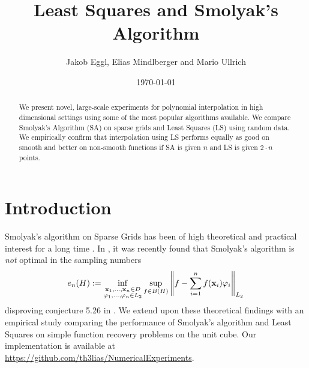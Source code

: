 \documentclass[12pt, oneside]{amsart}
\theoremstyle{definition}
\theoremstyle{remark}
\numberwithin{equation}{section}
\begin{document}
\title{Least Squares and Smolyak's Algorithm}

\author{Jakob Eggl, Elias Mindlberger and Mario Ullrich}
\date{\today}

%
%



\begin{abstract}
	We present novel, large-scale experiments for polynomial interpolation in 
	high dimensional settings using some of the most popular algorithms 
	available. 
	We compare Smolyak's Algorithm (SA) on sparse grids and Least Squares (LS) 
	using random data. We empirically confirm that interpolation using LS 
	performs equally as good on smooth and better on non-smooth functions if SA 
	is given \(n\) and LS is given \(2 \cdot n\) points.
\end{abstract}

\maketitle


\section{Introduction}

Smolyak's algorithm on Sparse Grids has been of high theoretical and practical 
interest for a long time 
\cite{BarthelmannHighDim_2000,smolyak1963,Coleman_SmoylakGithub_2013,JuddSmolyak_2014}.
 In \cite{Krieg_2020}, it was recently found that Smolyak's algorithm is 
\emph{not} optimal in the sampling numbers
\[
e_n(H) \defn \inf_{\substack{\bfx_1, \dots, \bfx_n \in D \\ \phi_1, \dots, \phi_n 
		\in L_2}} \sup_{f \in B(H)} \norm[L_2]{f - \sum_{i=1}^n f(\bfx_i) 
		\phi_i}
\]
disproving conjecture 5.26 in \cite{Dung_Temlyakov_Ullrich_2018}. We extend 
upon these theoretical findings with an empirical study comparing the 
performance of Smolyak's algorithm and Least Squares on simple function 
recovery problems on the unit cube. Our implementation is available at 
\url{https://github.com/th3lias/NumericalExperiments}.
\end{document}
